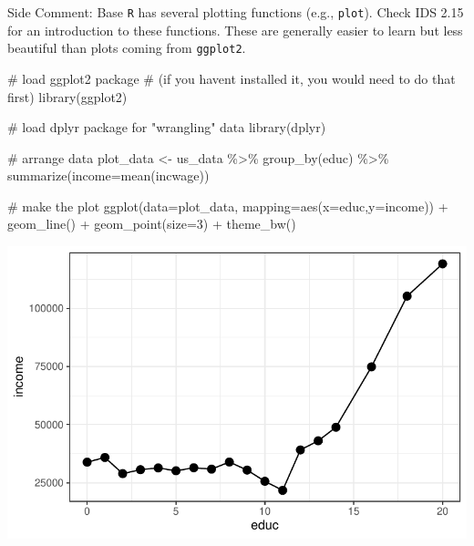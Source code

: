 \documentclass[
  letterpaper,
  DIV=11,
  numbers=noendperiod]{scrreprt}
\newenvironment{Shaded}{\begin{snugshade}}{\end{snugshade}}
\newcommand{\AttributeTok}[1]{\textcolor[rgb]{0.40,0.45,0.13}{#1}}
\newcommand{\CommentTok}[1]{\textcolor[rgb]{0.37,0.37,0.37}{#1}}
\newcommand{\DecValTok}[1]{\textcolor[rgb]{0.68,0.00,0.00}{#1}}
\newcommand{\FunctionTok}[1]{\textcolor[rgb]{0.28,0.35,0.67}{#1}}
\newcommand{\NormalTok}[1]{\textcolor[rgb]{0.00,0.23,0.31}{#1}}
\newcommand{\OtherTok}[1]{\textcolor[rgb]{0.00,0.23,0.31}{#1}}
\newcommand{\SpecialCharTok}[1]{\textcolor[rgb]{0.37,0.37,0.37}{#1}}
\begin{document}
{Side Comment:} Base \texttt{R} has several plotting functions (e.g.,
\texttt{plot}). Check IDS 2.15 for an introduction to these functions.
These are generally easier to learn but less beautiful than plots coming
from \texttt{ggplot2}.

\begin{Shaded}
\begin{Highlighting}[]
\CommentTok{\# load ggplot2 package}
\CommentTok{\# (if you haven\textquotesingle{}t installed it, you would need to do that first)}
\FunctionTok{library}\NormalTok{(ggplot2)}

\CommentTok{\# load dplyr package for "wrangling" data}
\FunctionTok{library}\NormalTok{(dplyr)}
\end{Highlighting}
\end{Shaded}

\begin{Shaded}
\begin{Highlighting}[]
\CommentTok{\# arrange data}
\NormalTok{plot\_data }\OtherTok{\textless{}{-}}\NormalTok{ us\_data }\SpecialCharTok{\%\textgreater{}\%}
    \FunctionTok{group\_by}\NormalTok{(educ) }\SpecialCharTok{\%\textgreater{}\%}
    \FunctionTok{summarize}\NormalTok{(}\AttributeTok{income=}\FunctionTok{mean}\NormalTok{(incwage))}

\CommentTok{\# make the plot}
\FunctionTok{ggplot}\NormalTok{(}\AttributeTok{data=}\NormalTok{plot\_data,}
       \AttributeTok{mapping=}\FunctionTok{aes}\NormalTok{(}\AttributeTok{x=}\NormalTok{educ,}\AttributeTok{y=}\NormalTok{income)) }\SpecialCharTok{+}
    \FunctionTok{geom\_line}\NormalTok{() }\SpecialCharTok{+}
    \FunctionTok{geom\_point}\NormalTok{(}\AttributeTok{size=}\DecValTok{3}\NormalTok{) }\SpecialCharTok{+}
    \FunctionTok{theme\_bw}\NormalTok{()}
\end{Highlighting}
\end{Shaded}

\includegraphics{04-expectations_files/figure-pdf/unnamed-chunk-5-1.pdf}
\end{document}
